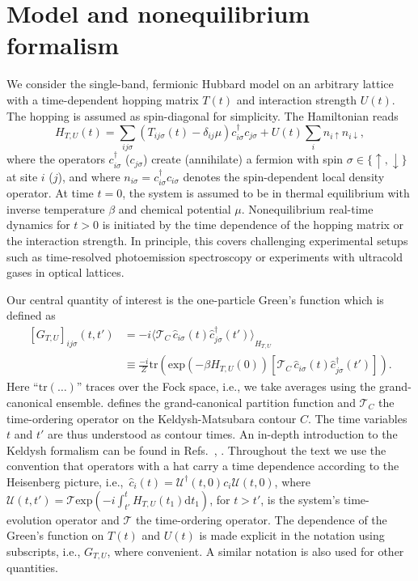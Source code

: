 \documentclass[twocolumn,prb,showpacs,aps,superscriptaddress]{revtex4}
\newcommand{\cds}[1]{\ensuremath{c^\dagger_{#1}}}
\newcommand{\ccs}[1]{\ensuremath{c_{#1}}}
\newcommand{\cd}[1]{\ensuremath{\hat{c}^\dagger_{#1}}}
\newcommand{\cc}[1]{\ensuremath{\hat{c}_{#1}}}
\newcommand{\est}[1]{\ensuremath{\langle {#1} \rangle}}
\newcommand{\dt}[0]{\ensuremath{\mathrm{d}t}}
\renewcommand{\exp}[1]{\ensuremath{\mathrm{exp}\left({#1}\right)}}
\newcommand{\trace}[1]{\ensuremath{\mathrm{tr}\left({#1}\right)}}
\newcommand{\torder}[0]{\ensuremath{\mathcal{T}}}
\newcommand{\tcorder}[0]{\ensuremath{\mathcal{T}_C}}
\begin{document}
\section{Model and nonequilibrium formalism}
\label{sec:noneq_formalism}

We consider the single-band, fermionic Hubbard model on an arbitrary lattice
with a time-dependent hopping matrix $T(t)$ and interaction strength $U(t)$.
The hopping is assumed as spin-diagonal for simplicity. The Hamiltonian reads
\begin{equation}
  \label{eq:ham}
  H_{T,U}(t) =   \sum_{ij\sigma} (T_{ij\sigma}(t)-\delta_{ij}\mu)
  \cds{i\sigma}\ccs{j\sigma} 
  + U(t)\sum_{i}n_{i\uparrow}n_{i\downarrow},
\end{equation}
where the operators $\cds{i\sigma}$ ($\ccs{j\sigma}$) create (annihilate) a
fermion with spin $\sigma\in \{ \uparrow, \downarrow \}$ at site $i$ ($j$), and
where $n_{i\sigma} = \cds{i\sigma}\ccs{i\sigma}$ denotes the spin-dependent
local density operator. At time $t=0$, the system is assumed to be in thermal
equilibrium with inverse temperature $\beta$ and chemical potential $\mu$.
Nonequilibrium real-time dynamics for $t>0$ is initiated by the time dependence
of the hopping matrix or the interaction strength. In principle, this covers
challenging experimental setups such as time-resolved photoemission
spectroscopy\cite{perf:06} or experiments with ultracold gases in optical
lattices.\cite{bloch:08}

Our central quantity of interest is the one-particle Green's function which
is defined as
\begin{align}
	\label{eq:gf}
  [G_{T,U}]_{ij\sigma}(t,t') 
  &=   
  -i\est{\tcorder\,\cc{i\sigma}(t)\cd{j\sigma}(t')}_{H_{T, U}} \\
  &\equiv
  \frac{-i}{Z}
  \trace{
    \exp{
    -\beta H_{T,U}(0)
    }
    \left[
      \tcorder\,\cc{i\sigma}(t)\cd{j\sigma}(t')
    \right]
  }.\nonumber
\end{align}
Here ``$\text{tr}(\dots)$'' traces over the Fock space, i.e., we take averages
using the grand-canonical ensemble. \makebox{$Z=\trace{\exp{-\beta 
H_{T,U}(0)}}$} defines the grand-canonical partition function and
$\tcorder$ the time-ordering operator on the Keldysh-Matsubara contour $C$. 
The
time variables $t$ and $t'$ are thus understood as contour times. An in-depth
introduction to the Keldysh formalism \cite{kel:64} can be found in Refs.\
, . Throughout the text we use the
convention that operators with a hat carry a time dependence according to the
Heisenberg picture, i.e.,\ $\cc{i}(t) = \mathcal{U}^\dagger(t,0) \ccs{i}
\mathcal{U}(t,0)$, where $\mathcal{U}(t,t') = \torder \exp{-i\int^t_{t'}
H_{T,U}(t_1)\dt_1}$, for $t > t'$, is the system's time-evolution operator and
$\torder$ the time-ordering operator. The dependence of the Green's function on
$T(t)$ and $U(t)$ is made explicit in the notation using subscripts, i.e.,
$G_{T,U}$, where convenient.  A similar notation is also used for other
quantities.
\end{document}
